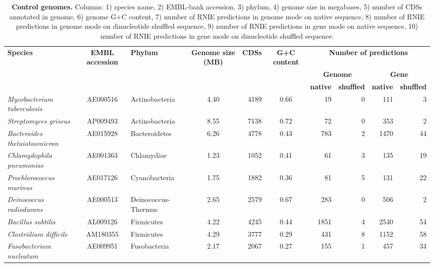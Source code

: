 %
\begingroup
\begin{landscape}
   \tiny
   \noindent
    \begin{longtable}{ l
    				c
				l
				c
				r
				c
				r
				r
				r
				r}
    \caption[Control genomes]{\textbf{Control genomes.} Columns: 1) species name,  2) EMBL-bank accession, 3) phylum, 4) genome size in megabases, 5) number of CDSs annotated in genome, 6) genome G+C content, 7) number of RNIE predictions in genome mode on native sequence, 8) number of RNIE predictions in genome mode on dinucleotide shuffled sequence, 9) number of RNIE predictions in gene mode on native sequence, 10) number of RNIE predictions in gene mode on dinucleotide shuffled sequence.}
    \\
    \toprule
    \textbf{Species} & \textbf{EMBL accession} & \textbf{Phylum} & \textbf{Genome size (MB)} & \textbf{CDSs} & \textbf{G+C content} & \multicolumn{4}{c}{\textbf{Number of predictions}} \\
    & & & & & & \multicolumn{2}{c}{\textbf{Genome}} & \multicolumn{2}{c}{\textbf{Gene}}\\
    & & & & & & \textbf{native} & \textbf{shuffled} & \textbf{native} & \textbf{shuffled}\\
    \midrule
    \textit{Mycobacterium tuberculosis} & AE000516 & Actinobacteria & 4.40 & 4189 & 0.66 & 19 & 0 & 111 & 3\\
    \textit{Streptomyces griseus} & AP009493 & Actinobacteria & 8.55 & 7138 & 0.72 & 72 & 0 & 353 & 2\\
    \textit{Bacteroides thetaiotaomicron} & AE015928 & Bacteroidetes & 6.26 & 4778 & 0.43 & 783 & 2 & 1470 & 44\\
    \textit{Chlamydophila pneumoniae} & AE001363 & Chlamydiae & 1.23 & 1052 & 0.41 & 61 & 3 & 135 & 19\\
    \textit{Prochlorococcus marinus} & AE017126 & Cyanobacteria & 1.75 & 1882 & 0.36 & 81 & 5 & 131 & 22\\
    \textit{Deinococcus radiodurans} & AE000513 & Deinococcus-Thermus & 2.65 & 2579 & 0.67 & 283 & 0 & 506 & 2\\
    \textit{Bacillus subtilis} & AL009126 & Firmicutes & 4.22 & 4245 & 0.44 & 1851 & 4 & 2540 & 54\\
    \textit{Clostridium difficile} & AM180355 & Firmicutes & 4.29 & 3777 & 0.29 & 431 & 8 & 1152 & 58\\
    \textit{Fusobacterium nucleatum} & AE009951 & Fusobacteria & 2.17 & 2067 & 0.27 & 155 & 1 & 457 & 34\\

\end{longtable}
\end{landscape}
